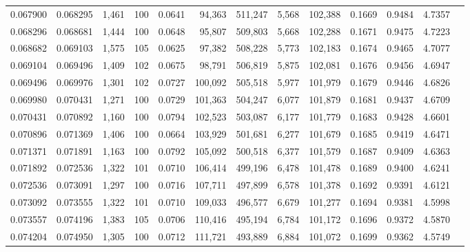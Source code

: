\begin{tabular}{rrrrrrrrrrrrr}
0.067900 & 0.068295 & 1,461 & 100 &                                     0.0641 &  94,363 & 511,247 &   5,568 & 102,388 & 0.1669 & 0.9484 & 4.7357 \\
0.068296 & 0.068681 & 1,444 & 100 &                                     0.0648 &  95,807 & 509,803 &   5,668 & 102,288 & 0.1671 & 0.9475 & 4.7223 \\
0.068682 & 0.069103 & 1,575 & 105 &                                     0.0625 &  97,382 & 508,228 &   5,773 & 102,183 & 0.1674 & 0.9465 & 4.7077 \\
0.069104 & 0.069496 & 1,409 & 102 &                                     0.0675 &  98,791 & 506,819 &   5,875 & 102,081 & 0.1676 & 0.9456 & 4.6947 \\
0.069496 & 0.069976 & 1,301 & 102 &                                     0.0727 & 100,092 & 505,518 &   5,977 & 101,979 & 0.1679 & 0.9446 & 4.6826 \\
0.069980 & 0.070431 & 1,271 & 100 &                                     0.0729 & 101,363 & 504,247 &   6,077 & 101,879 & 0.1681 & 0.9437 & 4.6709 \\
0.070431 & 0.070892 & 1,160 & 100 &                                     0.0794 & 102,523 & 503,087 &   6,177 & 101,779 & 0.1683 & 0.9428 & 4.6601 \\
0.070896 & 0.071369 & 1,406 & 100 &                                     0.0664 & 103,929 & 501,681 &   6,277 & 101,679 & 0.1685 & 0.9419 & 4.6471 \\
0.071371 & 0.071891 & 1,163 & 100 &                                     0.0792 & 105,092 & 500,518 &   6,377 & 101,579 & 0.1687 & 0.9409 & 4.6363 \\
0.071892 & 0.072536 & 1,322 & 101 &                                     0.0710 & 106,414 & 499,196 &   6,478 & 101,478 & 0.1689 & 0.9400 & 4.6241 \\
0.072536 & 0.073091 & 1,297 & 100 &                                     0.0716 & 107,711 & 497,899 &   6,578 & 101,378 & 0.1692 & 0.9391 & 4.6121 \\
0.073092 & 0.073555 & 1,322 & 101 &                                     0.0710 & 109,033 & 496,577 &   6,679 & 101,277 & 0.1694 & 0.9381 & 4.5998 \\
0.073557 & 0.074196 & 1,383 & 105 &                                     0.0706 & 110,416 & 495,194 &   6,784 & 101,172 & 0.1696 & 0.9372 & 4.5870 \\
0.074204 & 0.074950 & 1,305 & 100 &                                     0.0712 & 111,721 & 493,889 &   6,884 & 101,072 & 0.1699 & 0.9362 & 4.5749 \\

\end{tabular}
